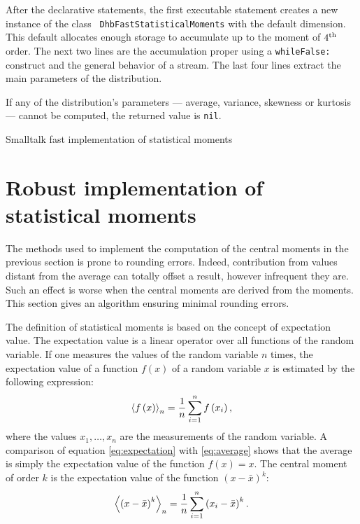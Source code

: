 \documentclass[twoside]{book}
\begin{document}
After the declarative statements, the first executable statement
creates a new instance of the class {\tt
DhbFastStatisticalMoments} with the default dimension. This
default allocates enough storage to accumulate up to the moment of
$4^{\mathop{\rm th}}$ order. The next two lines are the accumulation proper using
a {\tt whileFalse:} construct and the general behavior of a
stream. The last four lines extract the main parameters of the
distribution.

If any of the distribution's parameters --- average, variance,
skewness or kurtosis --- cannot be computed, the returned value is
{\tt nil}.

\begin{listing} Smalltalk fast implementation of statistical moments \label{ls:fastmoments}

\end{listing}


\section{Robust implementation of statistical moments}
\label{sec:robustmoment} The methods used to implement the
computation of the central moments in the previous section is
prone to rounding errors. Indeed, contribution from values distant
from the average can totally offset a result, however infrequent
they are. Such an effect is worse when the central moments are
derived from the moments. This section gives an algorithm ensuring
minimal rounding errors.

The definition of statistical moments is based on the concept of
expectation value. The expectation value is a linear operator over
all functions of the random variable. If one measures the values
of the random variable $n$ times, the expectation value of a
function $f\left(x\right)$ of a random variable $x$ is estimated
by the following expression:
\begin{equation}
\label{eq:expectation}
 \left\langle f\left(x\right)\right\rangle_n
= {1\over n}\sum_{i=1}^n f\left(x_i\right),
\end{equation}
where the values $x_1,\ldots,x_n$ are the measurements of the
random variable. A comparison of equation \ref{eq:expectation}
with \ref{eq:average} shows that the average is simply the
expectation value of the function $f\left(x\right)=x$. The central
moment of order $k$ is the expectation value of the function
$\left(x-\bar{x}\right)^k$:
\begin{equation}
\label{eq:expectmoment}
 \left\langle \left(x-\bar{x}\right)^k\right\rangle_n
= {1\over n}\sum_{i=1}^n \left(x_i-\bar{x}\right)^k.
\end{equation}
\end{document}
